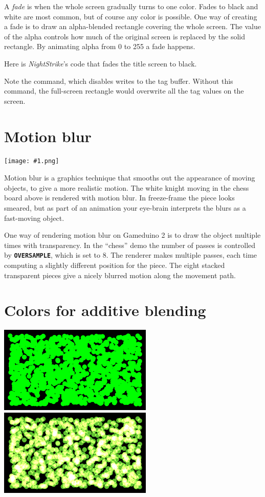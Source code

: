\documentclass[10pt]{book}
\makeatletter
\newcommand{\gdtwo}{Gameduino 2 }
\newcommand{\png}[1]{
\begin{center}
\texttt{[image: \#1.png]}
\end{center}
}
\newcommand{\mach}[1]{\texttt{\textbf{#1}}}
\newcommand{\cmdidx}[1]{
\index{#1@\mach{#1()}}
}
\newcommand{\dcmd}[1]{\cmdidx{#1}\nameref{#1}}
\newcommand{\term}[1]{\emph{#1}\index{#1}}
\makeatother
\begin{document}
A \term{fade} is when the whole screen gradually turns to one color.
Fades to black and white are most common, but of course any color is possible.
One way of creating a fade is to draw an alpha-blended rectangle covering the whole screen.
The value of the alpha controls how much of the original screen is replaced by the solid rectangle.
By animating alpha from 0 to 255 a fade happens.

Here is \textit{NightStrike}'s code that fades the title screen to black.


Note the \dcmd{TagMask} command, which disables writes
to the tag buffer.
Without this command,
the full-screen rectangle would overwrite all the tag values on the screen.

\newpage
\section{Motion blur}
\png{chess}

Motion blur is a graphics technique that smooths out the 
appearance of moving objects, to give a more realistic motion.
The white knight moving in the chess board above is rendered with
motion blur. In freeze-frame the piece looks smeared, but as part of
an animation your eye-brain interprets the blurs as
a fast-moving object.

One way of rendering motion blur on \gdtwo is to draw the object 
multiple times with transparency. In the ``chess'' demo the number of passes
is controlled by \mach{OVERSAMPLE}, which is set to 8.
The renderer makes multiple passes, each time computing a slightly different
position for the piece.  
The eight stacked transparent pieces give a nicely blurred motion along the movement path.


\newpage
\section{Colors for additive blending}

\begin{center}
\includegraphics[width=0.55\textwidth]{0048.png}
\includegraphics[width=0.55\textwidth]{0049.png}
\end{center}
\end{document}
